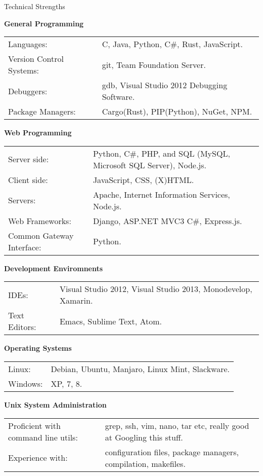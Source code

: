 \documentclass{resume} %
\newcommand{\btab}[2]{
	\bgroup
	\def\arraystretch{#1}
	\begin{tabular}{#2}
}
\newcommand{\etab}{
	\end{tabular} \smallskip
	\egroup
}
\begin{document}

\begin{rSection}{Technical Strengths}

{\bf General Programming}

\btab{1.1}{ l l }
	Languages: & C, Java, Python, C\#, Rust, JavaScript. \\
	Version Control Systems: & git, Team Foundation Server. \\
	Debuggers: & gdb, Visual Studio 2012 Debugging Software. \\
	Package Managers: & Cargo(Rust), PIP(Python), NuGet, NPM. \\
\etab

{\bf Web Programming}

\btab{1.1}{ l l }
	Server side: & Python, C\#, PHP, and SQL (MySQL, Microsoft SQL Server), Node.js. \\
	Client side: & JavaScript, CSS, (X)HTML. \\
	Servers: & Apache, Internet Information Services, Node.js. \\
	Web Frameworks: & Django, ASP.NET MVC3 C\#, Express.js. \\
	Common Gateway Interface: & Python. \\
\etab

{\bf Development Enviromnents}

\btab{1.1}{ l l }
    IDEs: & Visual Studio 2012, Visual Studio 2013, Monodevelop, Xamarin. \\
	Text Editors: & Emacs, Sublime Text, Atom. \\
\etab

{\bf Operating Systems}

\btab{1.1}{ l l }
	Linux: & Debian, Ubuntu, Manjaro, Linux Mint, Slackware. \\
	Windows: & XP, 7, 8. \\
\etab

{\bf Unix System Administration}

\btab{1.1}{ l l }
	Proficient with command line utils: & grep, ssh, vim, nano, tar etc, really good at Googling this stuff. \\
	Experience with: & configuration files, package managers, compilation, makefiles. \\
\etab

\end{rSection}
\end{document}
